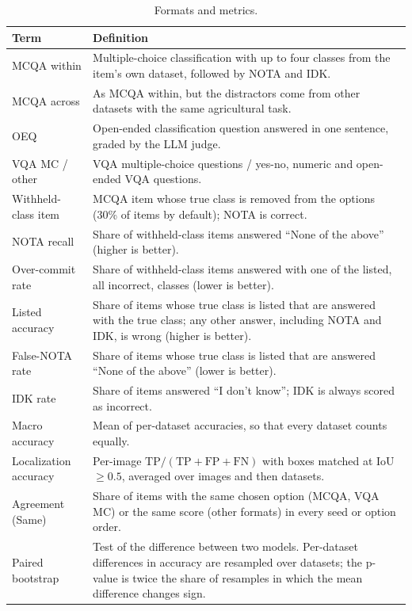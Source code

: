 \documentclass[10pt,letterpaper]{article}
\newcommand{\tablefont}{\footnotesize}
\begin{document}
\begin{table}[!tbp]
\centering
\caption{Formats and metrics.}
\label{tab:glossary}
\renewcommand{\arraystretch}{1.25}
\tablefont
\begin{tabular}{p{3.3cm} p{12.2cm}}
\toprule
\textbf{Term} & \textbf{Definition} \\
\midrule
MCQA within & Multiple-choice classification with up to four classes from the item's own dataset, followed by NOTA and IDK. \\
MCQA across & As MCQA within, but the distractors come from other datasets with the same agricultural task. \\
OEQ & Open-ended classification question answered in one sentence, graded by the LLM judge. \\
VQA MC / other & VQA multiple-choice questions / yes-no, numeric and open-ended VQA questions. \\
Withheld-class item & MCQA item whose true class is removed from the options (30\% of items by default); NOTA is correct. \\
NOTA recall & Share of withheld-class items answered ``None of the above'' (higher is better). \\
Over-commit rate & Share of withheld-class items answered with one of the listed, all incorrect, classes (lower is better). \\
Listed accuracy & Share of items whose true class is listed that are answered with the true class; any other answer, including NOTA and IDK, is wrong (higher is better). \\
False-NOTA rate & Share of items whose true class is listed that are answered ``None of the above'' (lower is better). \\
IDK rate & Share of items answered ``I don't know''; IDK is always scored as incorrect. \\
Macro accuracy & Mean of per-dataset accuracies, so that every dataset counts equally. \\
Localization accuracy & Per-image $\text{TP}/(\text{TP}+\text{FP}+\text{FN})$ with boxes matched at IoU $\geq 0.5$, averaged over images and then datasets. \\
Agreement (Same) & Share of items with the same chosen option (MCQA, VQA MC) or the same score (other formats) in every seed or option order. \\
Paired bootstrap & Test of the difference between two models. Per-dataset differences in accuracy are resampled over datasets; the p-value is twice the share of resamples in which the mean difference changes sign. \\

\end{tabular}
\end{table}
\end{document}
